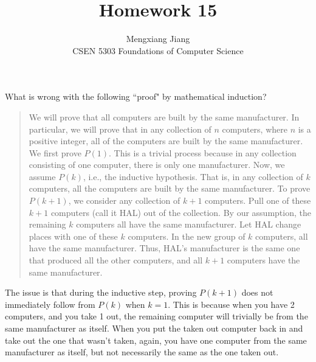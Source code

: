 \documentclass[12pt]{article}
\newenvironment{problem}[2][Problem]{\begin{trivlist}
\item[\hskip \labelsep {\bfseries #1}\hskip \labelsep {\bfseries #2.}]}{\end{trivlist}}
\begin{document}
 
 
\title{Homework 15}%
\author{Mengxiang Jiang\\ %
CSEN 5303 Foundations of Computer Science} %
 
\maketitle

\begin{problem}{1}
What is wrong with the following ``proof" by mathematical induction?
    \begin{quote}
    We will prove that all computers are built by the same manufacturer. In particular, we will prove
    that in any collection of $n$ computers, where $n$ is a positive integer, all of the computers are built
    by the same manufacturer. We first prove $P(1)$. This is a trivial process because in any collection
    consisting of one computer, there is only one manufacturer. Now, we assume $P(k)$, i.e., the
    inductive hypothesis. That is, in any collection of $k$ computers, all the computers are built by the
    same manufacturer. To prove $P(k + 1)$, we consider any collection of $k + 1$ computers. Pull one of
    these $k + 1$ computers (call it HAL) out of the collection. By our assumption, the remaining $k$
    computers all have the same manufacturer. Let HAL change places with one of these $k$ computers.
    In the new group of $k$ computers, all have the same manufacturer. Thus, HAL's manufacturer is
    the same one that produced all the other computers, and all $k + 1$ computers have the same
    manufacturer. 
    \end{quote}
The issue is that during the inductive step, proving $P(k+1)$ does not immediately follow from $P(k)$
when $k=1$. This is because when you have 2 computers, and you take 1 out, the remaining computer will trivially be from the same manufacturer as itself.
When you put the taken out computer back in and take out the one that wasn't taken, again, you have one computer from the same manufacturer as itself, but not necessarily the same as the one taken out.
\end{problem}
\pagebreak
\end{document}

